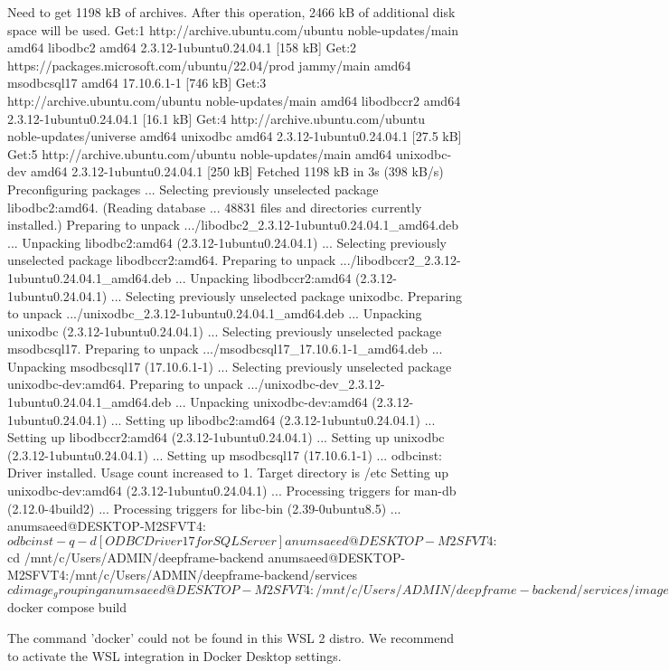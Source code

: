 Need to get 1198 kB of archives.
After this operation, 2466 kB of additional disk space will be used.
Get:1 http://archive.ubuntu.com/ubuntu noble-updates/main amd64 libodbc2 amd64 2.3.12-1ubuntu0.24.04.1 [158 kB]
Get:2 https://packages.microsoft.com/ubuntu/22.04/prod jammy/main amd64 msodbcsql17 amd64 17.10.6.1-1 [746 kB]
Get:3 http://archive.ubuntu.com/ubuntu noble-updates/main amd64 libodbccr2 amd64 2.3.12-1ubuntu0.24.04.1 [16.1 kB]
Get:4 http://archive.ubuntu.com/ubuntu noble-updates/universe amd64 unixodbc amd64 2.3.12-1ubuntu0.24.04.1 [27.5 kB]
Get:5 http://archive.ubuntu.com/ubuntu noble-updates/main amd64 unixodbc-dev amd64 2.3.12-1ubuntu0.24.04.1 [250 kB]
Fetched 1198 kB in 3s (398 kB/s)
Preconfiguring packages ...
Selecting previously unselected package libodbc2:amd64.
(Reading database ... 48831 files and directories currently installed.)
Preparing to unpack .../libodbc2_2.3.12-1ubuntu0.24.04.1_amd64.deb ...
Unpacking libodbc2:amd64 (2.3.12-1ubuntu0.24.04.1) ...
Selecting previously unselected package libodbccr2:amd64.
Preparing to unpack .../libodbccr2_2.3.12-1ubuntu0.24.04.1_amd64.deb ...
Unpacking libodbccr2:amd64 (2.3.12-1ubuntu0.24.04.1) ...
Selecting previously unselected package unixodbc.
Preparing to unpack .../unixodbc_2.3.12-1ubuntu0.24.04.1_amd64.deb ...
Unpacking unixodbc (2.3.12-1ubuntu0.24.04.1) ...
Selecting previously unselected package msodbcsql17.
Preparing to unpack .../msodbcsql17_17.10.6.1-1_amd64.deb ...
Unpacking msodbcsql17 (17.10.6.1-1) ...
Selecting previously unselected package unixodbc-dev:amd64.
Preparing to unpack .../unixodbc-dev_2.3.12-1ubuntu0.24.04.1_amd64.deb ...
Unpacking unixodbc-dev:amd64 (2.3.12-1ubuntu0.24.04.1) ...
Setting up libodbc2:amd64 (2.3.12-1ubuntu0.24.04.1) ...
Setting up libodbccr2:amd64 (2.3.12-1ubuntu0.24.04.1) ...
Setting up unixodbc (2.3.12-1ubuntu0.24.04.1) ...
Setting up msodbcsql17 (17.10.6.1-1) ...
odbcinst: Driver installed. Usage count increased to 1.
    Target directory is /etc
Setting up unixodbc-dev:amd64 (2.3.12-1ubuntu0.24.04.1) ...
Processing triggers for man-db (2.12.0-4build2) ...
Processing triggers for libc-bin (2.39-0ubuntu8.5) ...
anumsaeed@DESKTOP-M2SFVT4:~$ odbcinst -q -d
[ODBC Driver 17 for SQL Server]
anumsaeed@DESKTOP-M2SFVT4:~$ cd /mnt/c/Users/ADMIN/deepframe-backend
anumsaeed@DESKTOP-M2SFVT4:/mnt/c/Users/ADMIN/deepframe-backend/services$ cd image_grouping
anumsaeed@DESKTOP-M2SFVT4:/mnt/c/Users/ADMIN/deepframe-backend/services/image_grouping$ docker compose build

The command 'docker' could not be found in this WSL 2 distro.
We recommend to activate the WSL integration in Docker Desktop settings.

